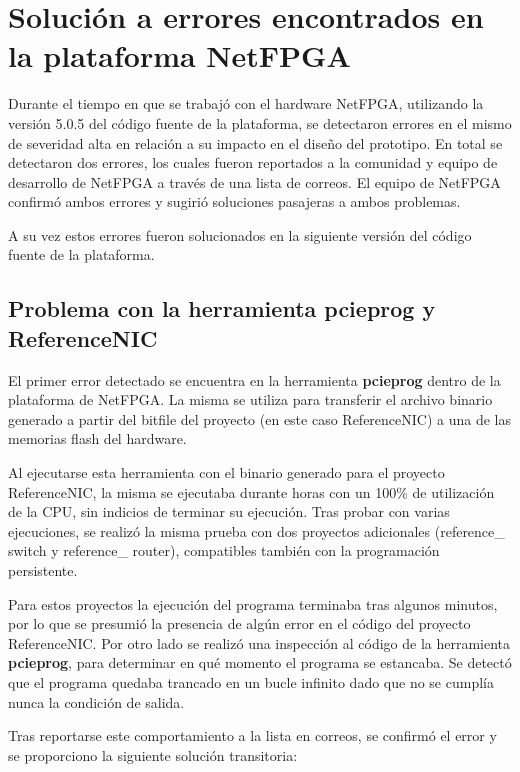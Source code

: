 \chapter{Soluci\'on a errores encontrados en la plataforma NetFPGA} 
\label{apendiceA}

Durante el tiempo en que se trabaj\'o con el hardware NetFPGA, utilizando la versi\'on 5.0.5 del c\'odigo fuente de la plataforma, se detectaron errores en el mismo de severidad alta en relaci\'on a su impacto en el diseño del prototipo. En total se detectaron dos errores, los cuales fueron reportados a la comunidad y equipo de desarrollo de NetFPGA a través de una lista de correos\citep{NetFPGABetaMailing}. El equipo de NetFPGA confirm\'o ambos errores y sugirió soluciones pasajeras a ambos problemas.

A su vez estos errores fueron solucionados en la siguiente versi\'on del c\'odigo fuente de la plataforma.
 
\section{Problema con la herramienta pcieprog y \\ ReferenceNIC}
El primer error detectado se encuentra en la herramienta \textbf{pcieprog} dentro de la plataforma de NetFPGA. La misma se utiliza para transferir el archivo binario generado a partir del bitfile del proyecto (en este caso ReferenceNIC) a una de las memorias flash del hardware.

Al ejecutarse esta herramienta con el binario generado para el proyecto ReferenceNIC, la misma se ejecutaba durante horas con un 100\% de utilizaci\'on de la CPU, sin indicios de terminar su ejecución. Tras probar con varias ejecuciones, se realiz\'o la misma prueba con dos proyectos adicionales (reference\_ switch y reference\_ router), compatibles también con la programaci\'on persistente. 

Para estos proyectos la ejecución del programa terminaba tras algunos minutos, por lo que se presumi\'o la presencia de algún error en el c\'odigo del proyecto ReferenceNIC. Por otro lado se realiz\'o una inspecci\'on al c\'odigo de la herramienta \textbf{pcieprog}, para determinar en qu\'e momento el programa se estancaba. Se detect\'o que el programa quedaba trancado en un bucle infinito dado que no se cumplía nunca la condici\'on de salida.

Tras reportarse este comportamiento a la lista en correos\citep{NetFPGABetaMailing}, se confirm\'o el error y se proporciono la siguiente solución transitoria:

